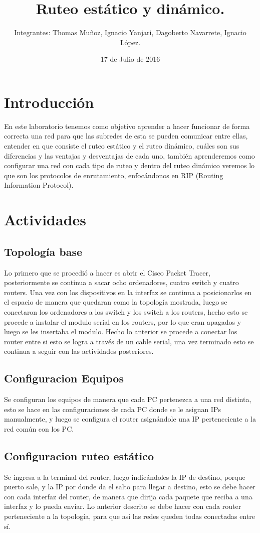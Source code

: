 \documentclass{udpreport}
\title{Ruteo estático y dinámico. }
\author{Integrantes: Thomas Muñoz, Ignacio Yanjari, Dagoberto Navarrete, Ignacio López.}
\date{17 de Julio de 2016}
\begin{document}
\maketitle
\tableofcontents
\listoffigures
\chapter{Introducción}
  En este laboratorio tenemos como objetivo aprender a hacer funcionar de forma correcta una red para que las subredes de esta se
  pueden comunicar entre ellas, entender en que consiste el ruteo estático y el ruteo dinámico, cuáles son sus diferencias y las
  ventajas y desventajas de cada uno, también aprenderemos como configurar una red con cada tipo de ruteo y dentro del ruteo dinámico
  veremos lo que son los protocolos de enrutamiento, enfocándonos en RIP (Routing Information Protocol).
\chapter{Actividades}
	\section{Topología base}
	Lo primero que se procedió a hacer es abrir el Cisco Packet Tracer, posteriormente se continua a sacar ocho ordenadores,
	cuatro switch y cuatro routers. Una vez con los dispositivos en la interfaz se continua a posicionarlos en el espacio de
	manera que quedaran como la topología mostrada, luego se conectaron los ordenadores a los switch y los switch a los
	routers, hecho esto se procede a instalar el modulo serial en los routers, por lo que eran apagados y luego se les insertaba
	el modulo. Hecho lo anterior se procede a conectar los router entre si esto se logra a través de un cable serial, una vez
	terminado esto se continua a seguir con las actividades posteriores.\\
	\section{Configuracion Equipos}
	Se configuran los equipos de manera que cada PC pertenezca a una red distinta, esto se hace en las configuraciones de cada PC
	donde se le asignan IPs manualmente, y luego se configura el router asignándole una IP perteneciente a la red común con los 
	PC.\\
	\section{Configuracion ruteo estático}
	Se ingresa a la terminal del router, luego indicándoles la IP de destino, porque puerto sale, y la IP por donde da el salto
	para llegar a destino, esto se debe hacer con cada interfaz del router, de manera que dirija cada paquete que reciba a una
	interfaz y lo pueda enviar. Lo anterior descrito se debe hacer con cada router perteneciente a la topología, para que así las
	redes queden todas conectadas entre sí.\\
\end{document}
